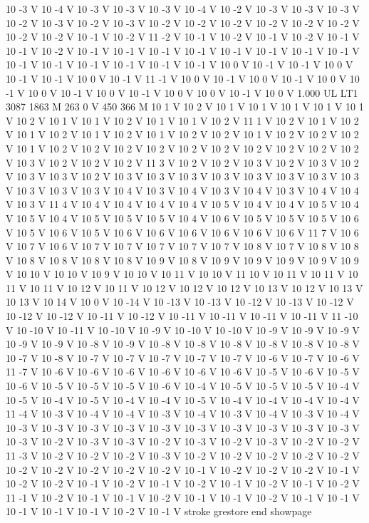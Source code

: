 {{10 -3 V
10 -4 V
10 -3 V
10 -3 V
10 -3 V
10 -4 V
10 -2 V
10 -3 V
10 -3 V
10 -3 V
10 -2 V
10 -3 V
10 -2 V
10 -3 V
10 -2 V
10 -2 V
10 -2 V
10 -2 V
10 -2 V
10 -2 V
10 -2 V
10 -2 V
10 -1 V
10 -2 V
11 -2 V
10 -1 V
10 -2 V
10 -1 V
10 -2 V
10 -1 V
10 -1 V
10 -2 V
10 -1 V
10 -1 V
10 -1 V
10 -1 V
10 -1 V
10 -1 V
10 -1 V
10 -1 V
10 -1 V
10 -1 V
10 -1 V
10 -1 V
10 -1 V
10 -1 V
10 0 V
10 -1 V
10 -1 V
10 0 V
10 -1 V
10 -1 V
10 0 V
10 -1 V
11 -1 V
10 0 V
10 -1 V
10 0 V
10 -1 V
10 0 V
10 -1 V
10 0 V
10 -1 V
10 0 V
10 -1 V
10 0 V
10 0 V
10 -1 V
10 0 V
1.000 UL
LT1
3087 1863 M
263 0 V
450 366 M
10 1 V
10 2 V
10 1 V
10 1 V
10 1 V
10 1 V
10 1 V
10 2 V
10 1 V
10 1 V
10 2 V
10 1 V
10 1 V
10 2 V
11 1 V
10 2 V
10 1 V
10 2 V
10 1 V
10 2 V
10 1 V
10 2 V
10 1 V
10 2 V
10 2 V
10 1 V
10 2 V
10 2 V
10 2 V
10 1 V
10 2 V
10 2 V
10 2 V
10 2 V
10 2 V
10 2 V
10 2 V
10 2 V
10 2 V
10 2 V
10 3 V
10 2 V
10 2 V
10 2 V
11 3 V
10 2 V
10 2 V
10 3 V
10 2 V
10 3 V
10 2 V
10 3 V
10 3 V
10 2 V
10 3 V
10 3 V
10 3 V
10 3 V
10 3 V
10 3 V
10 3 V
10 3 V
10 3 V
10 3 V
10 3 V
10 4 V
10 3 V
10 4 V
10 3 V
10 4 V
10 3 V
10 4 V
10 4 V
10 3 V
11 4 V
10 4 V
10 4 V
10 4 V
10 4 V
10 5 V
10 4 V
10 4 V
10 5 V
10 4 V
10 5 V
10 4 V
10 5 V
10 5 V
10 5 V
10 4 V
10 6 V
10 5 V
10 5 V
10 5 V
10 6 V
10 5 V
10 6 V
10 5 V
10 6 V
10 6 V
10 6 V
10 6 V
10 6 V
10 6 V
11 7 V
10 6 V
10 7 V
10 6 V
10 7 V
10 7 V
10 7 V
10 7 V
10 7 V
10 8 V
10 7 V
10 8 V
10 8 V
10 8 V
10 8 V
10 8 V
10 8 V
10 9 V
10 8 V
10 9 V
10 9 V
10 9 V
10 9 V
10 9 V
10 10 V
10 10 V
10 9 V
10 10 V
10 11 V
10 10 V
11 10 V
10 11 V
10 11 V
10 11 V
10 11 V
10 12 V
10 11 V
10 12 V
10 12 V
10 12 V
10 13 V
10 12 V
10 13 V
10 13 V
10 14 V
10 0 V
10 -14 V
10 -13 V
10 -13 V
10 -12 V
10 -13 V
10 -12 V
10 -12 V
10 -12 V
10 -11 V
10 -12 V
10 -11 V
10 -11 V
10 -11 V
10 -11 V
11 -10 V
10 -10 V
10 -11 V
10 -10 V
10 -9 V
10 -10 V
10 -10 V
10 -9 V
10 -9 V
10 -9 V
10 -9 V
10 -9 V
10 -8 V
10 -9 V
10 -8 V
10 -8 V
10 -8 V
10 -8 V
10 -8 V
10 -8 V
10 -7 V
10 -8 V
10 -7 V
10 -7 V
10 -7 V
10 -7 V
10 -7 V
10 -6 V
10 -7 V
10 -6 V
11 -7 V
10 -6 V
10 -6 V
10 -6 V
10 -6 V
10 -6 V
10 -6 V
10 -5 V
10 -6 V
10 -5 V
10 -6 V
10 -5 V
10 -5 V
10 -5 V
10 -6 V
10 -4 V
10 -5 V
10 -5 V
10 -5 V
10 -4 V
10 -5 V
10 -4 V
10 -5 V
10 -4 V
10 -4 V
10 -5 V
10 -4 V
10 -4 V
10 -4 V
10 -4 V
11 -4 V
10 -3 V
10 -4 V
10 -4 V
10 -3 V
10 -4 V
10 -3 V
10 -4 V
10 -3 V
10 -4 V
10 -3 V
10 -3 V
10 -3 V
10 -3 V
10 -3 V
10 -3 V
10 -3 V
10 -3 V
10 -3 V
10 -3 V
10 -3 V
10 -2 V
10 -3 V
10 -3 V
10 -2 V
10 -3 V
10 -2 V
10 -3 V
10 -2 V
10 -2 V
11 -3 V
10 -2 V
10 -2 V
10 -2 V
10 -3 V
10 -2 V
10 -2 V
10 -2 V
10 -2 V
10 -2 V
10 -2 V
10 -2 V
10 -2 V
10 -2 V
10 -2 V
10 -1 V
10 -2 V
10 -2 V
10 -2 V
10 -1 V
10 -2 V
10 -2 V
10 -1 V
10 -2 V
10 -1 V
10 -2 V
10 -1 V
10 -2 V
10 -1 V
10 -2 V
11 -1 V
10 -2 V
10 -1 V
10 -1 V
10 -2 V
10 -1 V
10 -1 V
10 -2 V
10 -1 V
10 -1 V
10 -1 V
10 -1 V
10 -1 V
10 -2 V
10 -1 V
stroke
grestore
end
showpage
}}%
